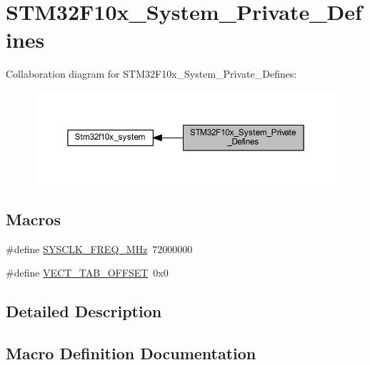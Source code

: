 \hypertarget{group___s_t_m32_f10x___system___private___defines}{}\section{S\+T\+M32\+F10x\+\_\+\+System\+\_\+\+Private\+\_\+\+Defines}
\label{group___s_t_m32_f10x___system___private___defines}
Collaboration diagram for S\+T\+M32\+F10x\+\_\+\+System\+\_\+\+Private\+\_\+\+Defines\+:
\nopagebreak
\begin{figure}[H]
\begin{center}
\leavevmode
\includegraphics[width=350pt]{group___s_t_m32_f10x___system___private___defines}
\end{center}
\end{figure}
\subsection*{Macros}
\begin{DoxyCompactItemize}
\item 
\#define \hyperlink{group___s_t_m32_f10x___system___private___defines_ga69649cc38f34627cfb48b51062ebd390}{S\+Y\+S\+C\+L\+K\+\_\+\+F\+R\+E\+Q\+\_\+M\+Hz}~72000000
\item 
\#define \hyperlink{group___s_t_m32_f10x___system___private___defines_ga40e1495541cbb4acbe3f1819bd87a9fe}{V\+E\+C\+T\+\_\+\+T\+A\+B\+\_\+\+O\+F\+F\+S\+ET}~0x0
\end{DoxyCompactItemize}


\subsection{Detailed Description}


\subsection{Macro Definition Documentation}
\mbox{\label{group___s_t_m32_f10x___system___private___defines_ga69649cc38f34627cfb48b51062ebd390}} 
